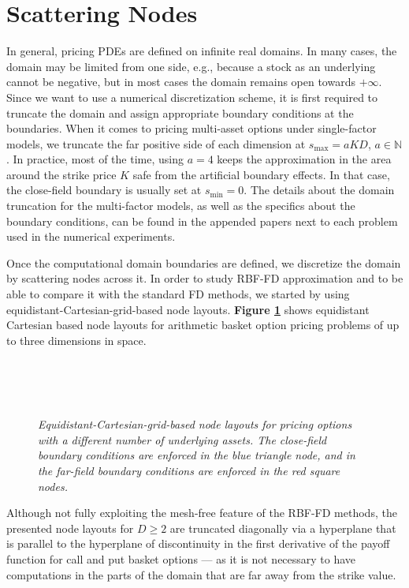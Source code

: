 \documentclass{UUThesisTemplate}
\begin{document}
\section{Scattering Nodes}
In general, pricing PDEs are defined on infinite real domains. In many cases, the domain may be limited from one side, e.g., because a stock as an underlying cannot be negative, but in most cases the domain remains open towards $+\infty$. Since we want to use a numerical discretization scheme, it is first required to truncate the domain and assign appropriate boundary conditions at the boundaries. When it comes to pricing multi-asset options under single-factor models, we truncate the far positive side of each dimension at $s_{\max}=aKD$, $a\in\mathbb{N}$. In practice, most of the time, using $a=4$ keeps the approximation in the area around the strike price $K$ safe from the artificial boundary effects. In that case, the close-field boundary is usually set at $s_{\min}=0$. The details about the domain truncation for the multi-factor models, as well as the specifics about the boundary conditions, can be found in the appended papers next to each problem used in the numerical experiments.
\par Once the computational domain boundaries are defined, we discretize the domain by scattering nodes across it. In order to study RBF-FD approximation and to be able to compare it with the standard FD methods, we started by using equidistant-Cartesian-grid-based node layouts. \textbf{Figure \ref{fig:gridreg}} shows equidistant Cartesian based node layouts for arithmetic basket option pricing problems of up to three dimensions in space.  
\begin{figure}[H]
\centering
\\
\vspace{11pt}
\\
\vspace{11pt}
\\
\caption{\emph{Equidistant-Cartesian-grid-based node layouts for pricing options with a different number of underlying assets. The close-field boundary conditions are enforced in the blue triangle node, and in the far-field boundary conditions are enforced in the red square nodes.}}
\label{fig:gridreg}
\end{figure}
Although not fully exploiting the mesh-free feature of the RBF-FD methods, the presented node layouts for $D\geq2$ are truncated diagonally via a hyperplane that is parallel to the hyperplane of discontinuity in the first derivative of the payoff function for call and put basket options --- as it is not necessary to have computations in the parts of the domain that are far away from the strike value.  
\end{document}
